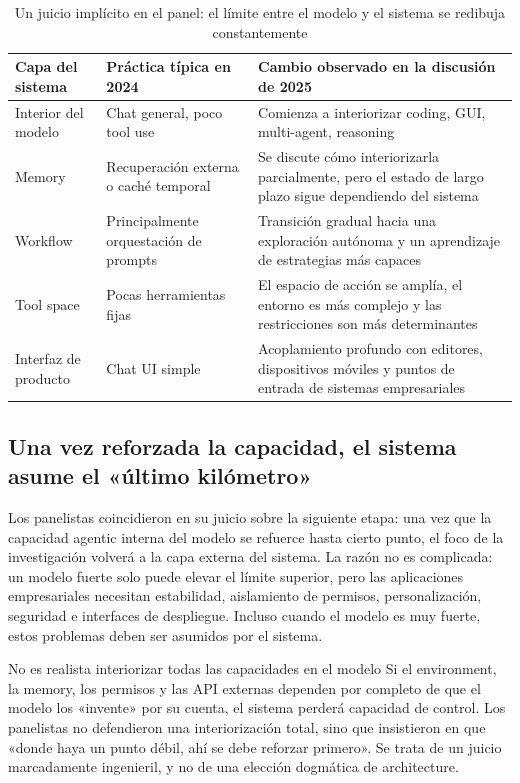 \begin{table}[H]
\centering
\begin{tabular}{p{3.0cm}p{4.3cm}p{4.3cm}}
\toprule
\textbf{Capa del sistema} & \textbf{Práctica típica en 2024} & \textbf{Cambio observado en la discusión de 2025} \\
\midrule
Interior del modelo & Chat general, poco tool use & Comienza a interiorizar coding, GUI, multi-agent, reasoning \\
Memory & Recuperación externa o caché temporal & Se discute cómo interiorizarla parcialmente, pero el estado de largo plazo sigue dependiendo del sistema \\
Workflow & Principalmente orquestación de prompts & Transición gradual hacia una exploración autónoma y un aprendizaje de estrategias más capaces \\
Tool space & Pocas herramientas fijas & El espacio de acción se amplía, el entorno es más complejo y las restricciones son más determinantes \\
Interfaz de producto & Chat UI simple & Acoplamiento profundo con editores, dispositivos móviles y puntos de entrada de sistemas empresariales \\
\bottomrule
\end{tabular}
\caption{Un juicio implícito en el panel: el límite entre el modelo y el sistema se redibuja constantemente}
\end{table}

\subsection{Una vez reforzada la capacidad, el sistema asume el «último kilómetro»}
Los panelistas coincidieron en su juicio sobre la siguiente etapa: una vez que la capacidad agentic interna del modelo se refuerce hasta cierto punto, el foco de la investigación volverá a la capa externa del sistema. La razón no es complicada: un modelo fuerte solo puede elevar el límite superior, pero las aplicaciones empresariales necesitan estabilidad, aislamiento de permisos, personalización, seguridad e interfaces de despliegue. Incluso cuando el modelo es muy fuerte, estos problemas deben ser asumidos por el sistema.

\begin{warningbox}{No es realista interiorizar todas las capacidades en el modelo}
Si el environment, la memory, los permisos y las API externas dependen por completo de que el modelo los «invente» por su cuenta, el sistema perderá capacidad de control. Los panelistas no defendieron una interiorización total, sino que insistieron en que «donde haya un punto débil, ahí se debe reforzar primero». Se trata de un juicio marcadamente ingenieril, y no de una elección dogmática de architecture.
\end{warningbox}

